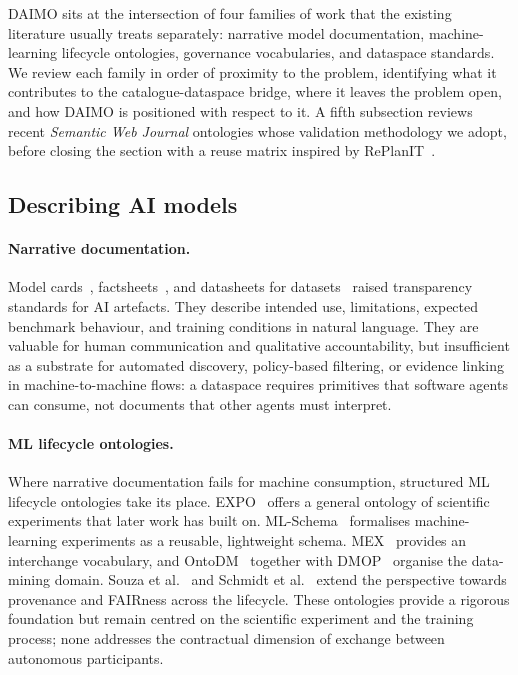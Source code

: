 \documentclass[Afour,sagev,times]{sagej}
\begin{document}
DAIMO sits at the intersection of four families of work that the existing literature usually treats separately: narrative model documentation, machine-learning lifecycle ontologies, governance vocabularies, and dataspace standards. We review each family in order of proximity to the problem, identifying what it contributes to the catalogue-dataspace bridge, where it leaves the problem open, and how DAIMO is positioned with respect to it. A fifth subsection reviews recent \emph{Semantic Web Journal} ontologies whose validation methodology we adopt, before closing the section with a reuse matrix inspired by RePlanIT~\cite{kurteva}.

\subsection{Describing AI models}

\paragraph{Narrative documentation.}

Model cards~\cite{mitchell19}, factsheets~\cite{arnold19}, and datasheets for datasets~\cite{gebru21} raised transparency standards for AI artefacts. They describe intended use, limitations, expected benchmark behaviour, and training conditions in natural language. They are valuable for human communication and qualitative accountability, but insufficient as a substrate for automated discovery, policy-based filtering, or evidence linking in machine-to-machine flows: a dataspace requires primitives that software agents can consume, not documents that other agents must interpret.

\paragraph{ML lifecycle ontologies.}

Where narrative documentation fails for machine consumption, structured ML lifecycle ontologies take its place. EXPO~\cite{expo} offers a general ontology of scientific experiments that later work has built on. ML-Schema~\cite{mls} formalises machine-learning experiments as a reusable, lightweight schema. MEX~\cite{mex} provides an interchange vocabulary, and OntoDM~\cite{ontodm} together with DMOP~\cite{dmop} organise the data-mining domain. Souza et al.~\cite{souza19} and Schmidt et al.~\cite{schmidt21} extend the perspective towards provenance and FAIRness across the lifecycle. These ontologies provide a rigorous foundation but remain centred on the scientific experiment and the training process; none addresses the contractual dimension of exchange between autonomous participants.
\end{document}
